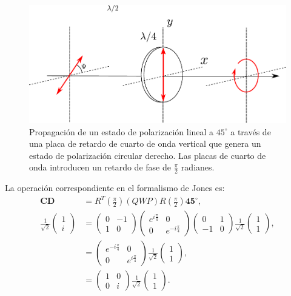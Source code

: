\begin{figure}[h!]
\centering
\includegraphics[scale=.7]{qwp_retarder}
\caption[Generación de estados de polarización circulares]{Propagación de un estado de polarización lineal a
  $45^{\circ}$ a través de una placa de retardo de cuarto de onda
  vertical que genera un estado de polarización circular derecho. Las
placas de cuarto de onda introducen un retardo de fase de
$\frac{\pi}{2}$ radianes.}
\label{fig:qwp_retarder}
\end{figure}
La operación correspondiente en el formalismo de Jones es:
\begin{align*}
\mathbf{CD} &=
R^{T}\left(\frac{\pi}{2}\right)\left(QWP\right)R\left(\frac{\pi}{2}\right)\mathbf{45}^{\circ},\\ 
  \frac{1}{\sqrt{2}}
\begin{pmatrix}
1\\i
\end{pmatrix}&=
\begin{pmatrix}
  0 &-1\\1&0
\end{pmatrix}
\begin{pmatrix} e^{i\frac{\pi}{4}}  &0\\0&e^{-i\frac{\pi}{4}} \end{pmatrix}
\begin{pmatrix}
  0&1\\-1&0
\end{pmatrix}
 \frac{1}{\sqrt{2}}
\begin{pmatrix}
1\\ 1
\end{pmatrix},
\\
&=
\begin{pmatrix}
e^{-i\frac{\pi}{4}}  & 0 \\0 & e^{i\frac{\pi}{4}} 
\end{pmatrix}
  \frac{1}{\sqrt{2}}
\begin{pmatrix}
1\\ 1
\end{pmatrix},\\
&=
\begin{pmatrix}
1  & 0 \\0 & i
\end{pmatrix}
  \frac{1}{\sqrt{2}}
\begin{pmatrix}
1\\ 1
\end{pmatrix}.
\end{align*}
